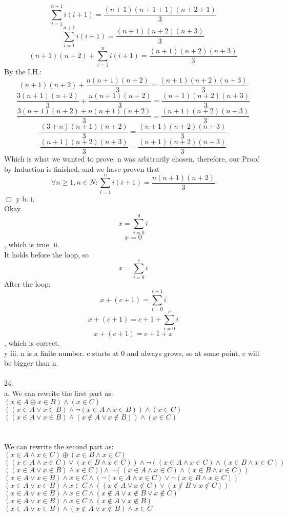 \documentclass{article}
\begin{document}
$$\sum_{i=1}^{n+1}i(i+1) = \frac{(n+1)(n+1+1)(n+2+1)}{3}$$
$$\sum_{i=1}^{n+1}i(i+1) = \frac{(n+1)(n+2)(n+3)}{3}$$
$$(n+1)(n+2) + \sum_{i=1}^{n}i(i+1) = \frac{(n+1)(n+2)(n+3)}{3}$$
By the I.H.:
$$(n+1)(n+2) + \frac{n(n+1)(n+2)}{3} = \frac{(n+1)(n+2)(n+3)}{3}$$
$$\frac{3(n+1)(n+2)}{3} + \frac{n(n+1)(n+2)}{3} = \frac{(n+1)(n+2)(n+3)}{3}$$
$$\frac{3(n+1)(n+2) + n(n+1)(n+2)}{3} = \frac{(n+1)(n+2)(n+3)}{3}$$
$$\frac{(3+n) (n+1)(n+2)}{3} = \frac{(n+1)(n+2)(n+3)}{3}$$
$$\frac{(n+1)(n+2)(n+3)}{3} = \frac{(n+1)(n+2)(n+3)}{3}$$
Which is what we wanted to prove. n was arbitrarily chosen, therefore, our Proof by Induction is finished, and we have proven that $$\forall n \geq 1, n \in N: \sum_{i=1}^{n}i(i+1) = \frac{n(n+1)(n+2)}{3}$$
$\Box$
y
b. i.\\ 
Okay.\\
$$x = \sum_{i=0}^{0}i$$
$$x = 0$$, which is true.
ii.\\
It holds before the loop, so $$x = \sum_{i=0}^{c}i$$
After the loop:$$x+(c+1) = \sum_{i=0}^{c+1}i$$
$$x+(c+1) = c+1 +\sum_{i=0}^{c}i$$
$$x+(c+1) = c+1 + x$$, which is correct.\\
y
iii. n is a finite number. c starts at 0 and always grows, so at some point, c will be bigger than n.\\
\\
24.\\
a. 
We can rewrite the first part as:\\
$(x \in A \oplus x \in B) \land (x \in C)$\\
$((x \in A \lor x \in B) \land \neg(x \in A \land x \in B)) \land (x \in C)$\\
$((x \in A \lor x \in B) \land ( x \not \in A \lor  x \not\in B)) \land (x \in C)$\\
\\
\\



We can rewrite the second part as:\\
$(x \in A \land x \in C) \oplus (x \in B \land x \in C)$\\
$((x \in A \land x \in C) \lor (x \in B \land x \in C)) \land \neg((x \in A \land x \in C) \land (x \in B \land x \in C))$\\
$((x \in A \lor x \in B ) \land x \in C)) \land \neg((x \in A \land x \in C) \land (x \in B \land x \in C))$\\
$(x \in A \lor x \in B ) \land x \in C \land (\neg(x \in A \land x \in C) \lor \neg(x \in B \land x \in C))$\\
$(x \in A \lor x \in B ) \land x \in C \land ((x \not \in A \lor x \not \in C) \lor (x \not \in B \lor x \not \in C))$\\
$(x \in A \lor x \in B ) \land x \in C \land (x \not \in A \lor x \not \in B \lor x \not \in C)$\\
$(x \in A \lor x \in B ) \land x \in C \land (x \not \in A \lor x \not \in B)$\\
$(x \in A \lor x \in B ) \land (x \not \in A \lor x \not \in B) \land x \in C $\\
\\
\end{document}
